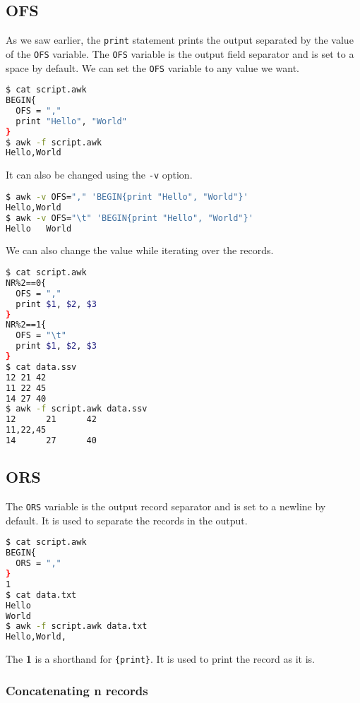 \subsection{OFS}

As we saw earlier, the \lstinline|print| statement prints the output separated by the value of the \lstinline|OFS| variable.
The \lstinline|OFS| variable is the output field separator and is set to a space by default.
We can set the \lstinline|OFS| variable to any value we want.

\begin{lstlisting}[language=bash]
$ cat script.awk
BEGIN{
  OFS = ","
  print "Hello", "World"
}
$ awk -f script.awk
Hello,World
\end{lstlisting}

It can also be changed using the \lstinline|-v| option.

\begin{lstlisting}[language=bash]
$ awk -v OFS="," 'BEGIN{print "Hello", "World"}'
Hello,World
$ awk -v OFS="\t" 'BEGIN{print "Hello", "World"}'
Hello   World
\end{lstlisting}

We can also change the value while iterating over the records.

\begin{lstlisting}[language=bash]
$ cat script.awk
NR%2==0{
  OFS = ","
  print $1, $2, $3
}
NR%2==1{
  OFS = "\t"
  print $1, $2, $3
}
$ cat data.ssv
12 21 42
11 22 45
14 27 40
$ awk -f script.awk data.ssv
12      21      42
11,22,45
14      27      40
\end{lstlisting}
\subsection{ORS}

The \lstinline|ORS| variable is the output record separator and is set to a newline by default.
It is used to separate the records in the output.

\begin{lstlisting}[language=bash]
$ cat script.awk
BEGIN{
  ORS = ","
}
1
$ cat data.txt
Hello
World
$ awk -f script.awk data.txt
Hello,World,
\end{lstlisting}

\begin{remark}
The \textbf{1} is a shorthand for \lstinline|{print}|. It is used to print the record as it is.
\end{remark}

\subsubsection{Concatenating n records}

